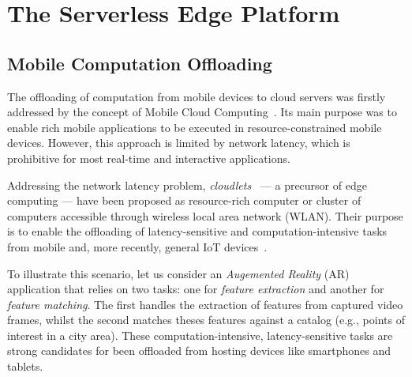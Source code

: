 \section{The Serverless Edge Platform}\label{sec:SEP}

\subsection{Mobile Computation Offloading}\label{sec:SEP_MCO}

The offloading of computation from mobile devices to cloud servers was firstly addressed by the concept of Mobile Cloud Computing~\cite{Khan:14}. Its main purpose was to enable rich mobile applications to be executed in resource-constrained mobile devices. However, this approach is limited by network latency, which is prohibitive for most real-time and interactive applications.

Addressing the network latency problem, \textit{cloudlets}~\cite{Satyanarayanan:2009} --- a precursor of edge computing --- have been proposed as resource-rich computer or cluster of computers  accessible through wireless local area network (WLAN). Their purpose is to enable the offloading of latency-sensitive and computation-intensive tasks from mobile and, more recently, general IoT devices~\cite{Satyanarayanan:2017}. 




To illustrate this scenario, let us consider an \textit{Augemented Reality} (AR) application that relies on two tasks: one for \textit{feature extraction} and another for \textit{feature matching}. The first handles the extraction of features from captured video frames, whilst the second matches theses features against a catalog (e.g., points of interest in a city area). 
These computation-intensive, latency-sensitive tasks are strong candidates for been offloaded from hosting devices like smartphones and tablets.

